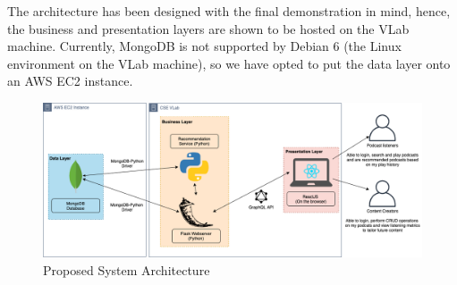 \documentclass[12pt]{article}
\begin{document}
The architecture has been designed with the final demonstration in mind, hence, the business and presentation layers are shown to be hosted on the VLab machine.
Currently, MongoDB is not supported by Debian 6 (the Linux environment on the VLab machine), so we have opted to put the data layer onto an AWS EC2 instance.

\begin{figure}[ht]
    \centering
    \includegraphics[width=\textwidth]{resources/SystemArchitecture}
    \caption{Proposed System Architecture}
    \label{fig:SysArch}
\end{figure}

\newpage


\end{document}
